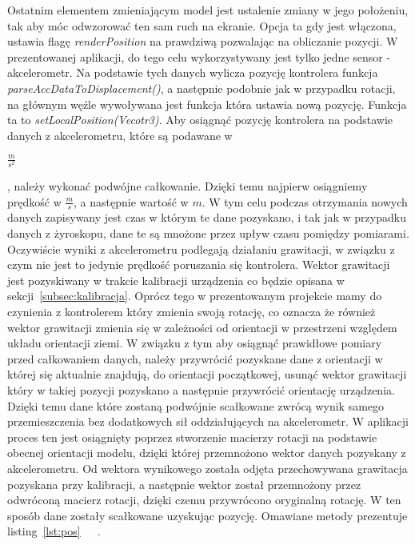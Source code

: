 	Ostatnim elementem zmieniającym model jest ustalenie zmiany w jego położeniu, tak aby móc odwzorować ten sam ruch na ekranie. Opcja ta gdy jest włączona, ustawia flagę \textit{renderPosition} na prawdziwą pozwalając na obliczanie pozycji. W prezentowanej aplikacji, do tego celu wykorzystywany jest tylko jedne sensor - akcelerometr. Na podstawie tych danych wylicza pozycję kontrolera funkcja \textit{parseAccDataToDisplacement()}, a następnie podobnie jak w przypadku rotacji, na głównym węźle wywoływana jest funkcja która ustawia nową pozycję. Funkcja ta to \textit{setLocalPosition(Vecotr3)}. Aby osiągnąć pozycję kontrolera na podstawie danych z akcelerometru, które są podawane w \begin{Large}
	$\frac{m}{s^2}$
	\end{Large}, należy wykonać podwójne całkowanie. Dzięki temu najpierw osiągniemy prędkość w {\Large$\frac{m}{s}$}, a następnie wartość w $m$. W tym celu podczas otrzymania nowych danych zapisywany jest czas w którym te dane pozyskano, i tak jak w przypadku danych z żyroskopu, dane te są mnożone przez upływ czasu pomiędzy pomiarami. Oczywiście wyniki z akcelerometru podlegają działaniu grawitacji, w związku z czym nie jest to jedynie prędkość poruszania się kontrolera. Wektor grawitacji jest pozyskiwany w trakcie kalibracji urządzenia co będzie opisana w sekcji~\ref{subsec:kalibracja}. Oprócz tego w prezentowanym projekcie mamy do czynienia z kontrolerem który zmienia swoją rotację, co oznacza że również wektor grawitacji zmienia się w zależności od orientacji w przestrzeni względem układu orientacji ziemi. W związku z tym aby osiągnąć prawidłowe pomiary przed całkowaniem danych, należy przywrócić pozyskane dane z orientacji w której się aktualnie znajdują, do orientacji początkowej, usunąć wektor grawitacji który w takiej pozycji pozyskano a następnie przywrócić orientację urządzenia. Dzięki temu dane które zostaną podwójnie scałkowane zwrócą wynik samego przemieszczenia bez dodatkowych sił oddziałujących na akcelerometr. W aplikacji proces ten jest osiągnięty poprzez stworzenie macierzy rotacji na podstawie obecnej orientacji modelu, dzięki której przemnożono wektor danych pozyskany z akcelerometru. Od wektora wynikowego została odjęta przechowywana grawitacja pozyskana przy kalibracji, a następnie wektor został przemnożony przez odwróconą macierz rotacji, dzięki czemu przywrócono oryginalną rotację. W ten sposób dane zostały scałkowane uzyskując pozycję. Omawiane metody prezentuje listing~\ref{lst:pos}~\cite{displacement3}~\cite{displacement2}~\cite{displacement}.
